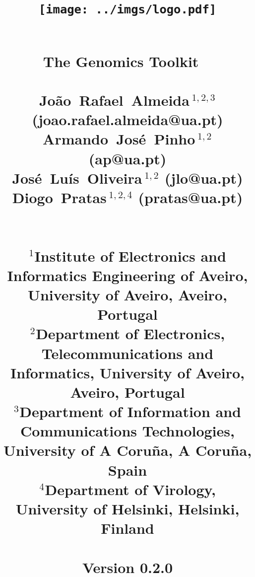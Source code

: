 \documentclass[11pt,journal,compsoc]{report}[1]
\begin{document}
\title{
%
\begin{figure}[h!]
\centerline{\texttt{[image: ../imgs/logo.pdf]}}
\label{logo}
\end{figure}
~\\
\textbf{The Genomics Toolkit}
~\\~\\
\large
Jo\~ao~Rafael~Almeida\,$^{1,2,3}$ (joao.rafael.almeida@ua.pt)\\
Armando~Jos\'e~Pinho\,$^{1,2}$ (ap@ua.pt)\\
Jos\'e~Lu\'is~Oliveira\,$^{1,2}$ (jlo@ua.pt)\\
Diogo~Pratas\,$^{1,2,4}$ (pratas@ua.pt)\\
~\\~\\
\small
$^1$Institute of Electronics and Informatics Engineering of Aveiro, University of Aveiro, Aveiro, Portugal\\
$^2$Department of Electronics, Telecommunications and Informatics, University of Aveiro, Aveiro, Portugal\\
$^3$Department of Information and Communications Technologies, University of A Coru\~na, A Coru\~na, Spain\\
$^4$Department of Virology, University of Helsinki, Helsinki, Finland\\
~\\
Version 0.2.0
}
\date{}
\maketitle

\tableofcontents

\def \AminoAcidSequenceToolsPath {sections/Amino_acid_sequence_tools}
\def \FASTQToolsPath {sections/FASTQ_tools}
\def \FASTAToolsPath {sections/FASTA_tools}
\def \GenomicSequenceToolsPath {sections/Genomic_sequence_tools}
\def \GeneralPurposeToolsPath {sections/General_purpose_tools}












\end{document}
